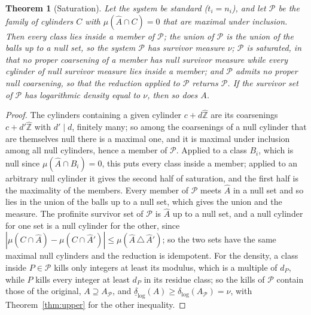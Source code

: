 \documentclass[11pt]{article}
\theoremstyle{plain}
\newtheorem{theorem}{Theorem}[section]
\theoremstyle{definition}
\newcommand{\Zhat}{\widehat{\mathbb{Z}}}
\newcommand{\dlog}{\delta_{\log}}
\newcommand{\Ahat}{\widehat{A}}
\begin{document}
\begin{theorem}[Saturation]\label{thm:sat}
Let the system be standard ($t_i=n_i$), and let $\mathcal{P}$ be the family of cylinders $C$ with
$\mu(\Ahat\cap C)=0$ that are maximal under inclusion.  Then every
class lies inside a member of $\mathcal{P}$; the union of
$\mathcal{P}$ is the union of the balls up to a null set, so the
system $\mathcal{P}$ has survivor measure $\nu$; $\mathcal{P}$ is
\emph{saturated}, in that no proper coarsening of a member has
null survivor measure while every cylinder of null survivor
measure lies inside a member; and $\mathcal{P}$ admits no
proper null coarsening, so that the reduction applied to
$\mathcal{P}$ returns $\mathcal{P}$.  If the survivor set of $\mathcal{P}$ has
logarithmic density equal to $\nu$, then so does $A$.
\end{theorem}

\begin{proof}
The cylinders containing a given cylinder $c+d\Zhat$ are its
coarsenings $c+d'\Zhat$ with $d'\mid d$, finitely many; so among
the coarsenings of a null cylinder that are themselves null there
is a maximal one, and it is maximal under inclusion among all
null cylinders, hence a member of $\mathcal{P}$.  Applied to a
class $B_i$, which is null since $\mu(\Ahat\cap B_i)=0$, this puts
every class inside a member; applied to an arbitrary null
cylinder it gives the second half of saturation, and the first
half is the maximality of the members.  Every member of
$\mathcal{P}$ meets $\Ahat$ in a null set and so lies in the union
of the balls up to a null set, which gives the union and the
measure.  The profinite survivor set of $\mathcal{P}$ is $\Ahat$ up
to a null set, and a null cylinder for one set is a null cylinder
for the other, since
$|\mu(C\cap\Ahat)-\mu(C\cap\Ahat')|\le\mu(\Ahat\,\triangle\,\Ahat')$;
so the two sets have the same maximal null cylinders and the
reduction is idempotent.  For the density, a class inside $P\in\mathcal{P}$
kills only integers at least its modulus, which is a multiple of
$d_P$, while $P$ kills every integer at least $d_P$ in its
residue class; so the kills of $\mathcal{P}$ contain those of the
original, $A\supseteq A_{\mathcal{P}}$, and
$\underline{\delta}_{\log}(A)\ge\dlog(A_{\mathcal{P}})=\nu$, with
Theorem~\ref{thm:upper} for the other inequality.
\end{proof}
\end{document}
